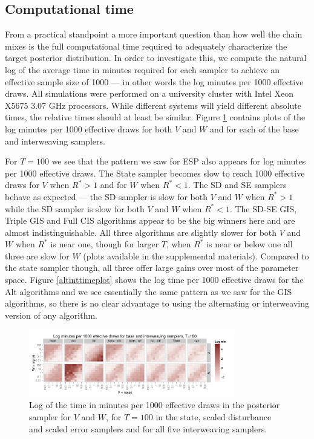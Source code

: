 \documentclass{article}
\begin{document}
\subsection{Computational time}\label{sec:LLM:time}

From a practical standpoint a more important question than how well the chain mixes is the full computational time required to adequately characterize the target posterior distribution. In order to investigate this, we compute the natural log of the average time in minutes required for each sampler to achieve an effective sample size of 1000 --- in other words the log minutes per 1000 effective draws. All simulations were performed on a university cluster with Intel Xeon X5675 3.07 GHz processors. While different systems will yield different absolute times, the relative times should at least be similar. Figure \ref{baseinttimeplot} contains plots of the log minutes per 1000 effective draws for both $V$ and $W$ and for each of the base and interweaving samplers.

For $T=100$ we see that the pattern we saw for ESP also appears for log minutes per 1000 effective draws. The State sampler becomes slow to reach 1000 effective draws for $V$ when $R^*>1$ and for $W$ when $R^*<1$. The SD and SE samplers behave as expected --- the SD sampler is slow for both $V$ and $W$ when $R^*>1$ while the SD sampler is slow for both $V$ and $W$ when $R^*<1$. The SD-SE GIS, Triple GIS and Full CIS algorithms appear to be the big winners here and are almost indistinguishable. All three algorithms are slightly slower for both $V$ and $W$ when $R^*$ is near one, though for larger $T$,  when $R^*$ is near or below one all three are slow for $W$ (plots available in the supplemental materials). Compared to the state sampler though, all three offer large gains over most of the parameter space. Figure \ref{altinttimeplot} shows the log time per 1000 effective draws for the Alt algorithms and we see essentially the same pattern as we saw for the GIS algorithms, so there is no clear advantage to using the alternating or interweaving version of any algorithm.


\begin{figure}[!ht]
\centering
\includegraphics[width=0.8\textwidth]{baseinttimeplot100}
\caption{Log of the time in minutes per 1000 effective draws in the posterior sampler for $V$ and $W$, for $T=100$ in the state, scaled disturbance and scaled error samplers and for all five interweaving samplers.}
\label{baseinttimeplot}
\end{figure}
\end{document}
